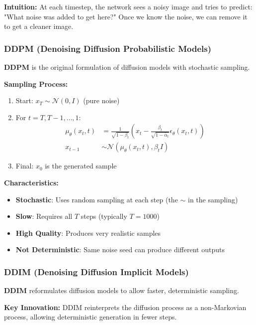 \documentclass[journal]{IEEEtran}
\begin{document}
\textbf{Intuition:} At each timestep, the network sees a noisy image and tries to predict: "What noise was added to get here?" Once we know the noise, we can remove it to get a cleaner image.

\subsubsection{DDPM (Denoising Diffusion Probabilistic Models)}

\textbf{DDPM} is the original formulation of diffusion models with stochastic sampling.

\textbf{Sampling Process:}
\begin{enumerate}
    \item Start: $x_T \sim \mathcal{N}(0, I)$ (pure noise)
    \item For $t = T, T-1, \ldots, 1$:
    \begin{align}
        \mu_\theta(x_t, t) &= \frac{1}{\sqrt{1-\beta_t}}\left(x_t - \frac{\beta_t}{\sqrt{1-\bar{\alpha}_t}} \epsilon_\theta(x_t, t)\right) \\
        x_{t-1} &\sim \mathcal{N}(\mu_\theta(x_t, t), \beta_t I)
    \end{align}
    \item Final: $x_0$ is the generated sample
\end{enumerate}

\textbf{Characteristics:}
\begin{itemize}
    \item \textbf{Stochastic}: Uses random sampling at each step (the $\sim$ in the sampling)
    \item \textbf{Slow}: Requires all $T$ steps (typically $T=1000$)
    \item \textbf{High Quality}: Produces very realistic samples
    \item \textbf{Not Deterministic}: Same noise seed can produce different outputs
\end{itemize}

\subsubsection{DDIM (Denoising Diffusion Implicit Models)}

\textbf{DDIM} reformulates diffusion models to allow faster, deterministic sampling.

\textbf{Key Innovation:} DDIM reinterprets the diffusion process as a non-Markovian process, allowing deterministic generation in fewer steps.
\end{document}
